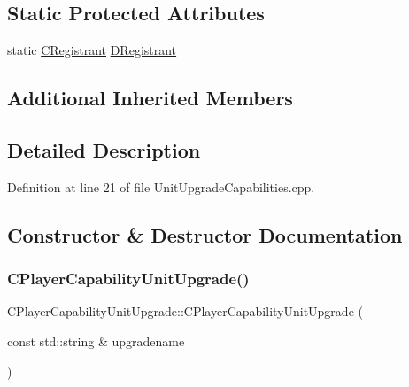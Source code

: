 \subsection*{Static Protected Attributes}
\begin{DoxyCompactItemize}
\item 
static \hyperlink{classCPlayerCapabilityUnitUpgrade_1_1CRegistrant}{C\+Registrant} \hyperlink{classCPlayerCapabilityUnitUpgrade_a7c078a1318b7cf56d1810ccd46b8fd8d}{D\+Registrant}
\end{DoxyCompactItemize}
\subsection*{Additional Inherited Members}


\subsection{Detailed Description}


Definition at line 21 of file Unit\+Upgrade\+Capabilities.\+cpp.



\subsection{Constructor \& Destructor Documentation}
\hypertarget{classCPlayerCapabilityUnitUpgrade_ac87129322f9f31cc271ee3de33502c56}{}\label{classCPlayerCapabilityUnitUpgrade_ac87129322f9f31cc271ee3de33502c56} 
\subsubsection{\texorpdfstring{C\+Player\+Capability\+Unit\+Upgrade()}{CPlayerCapabilityUnitUpgrade()}}
{\footnotesize\ttfamily C\+Player\+Capability\+Unit\+Upgrade\+::\+C\+Player\+Capability\+Unit\+Upgrade (\begin{DoxyParamCaption}\item[{const std\+::string \&}]{upgradename }\end{DoxyParamCaption})\hspace{0.3cm}{\ttfamily [protected]}}



